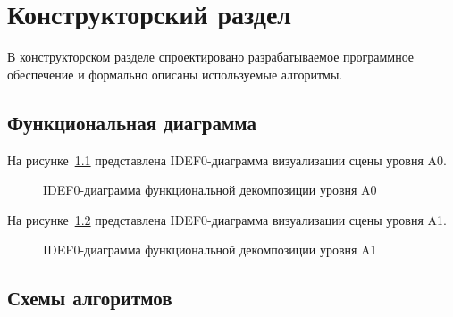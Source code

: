 \chapter{Конструкторский раздел}
В конструкторском разделе спроектировано разрабатываемое программное обеспечение и формально описаны используемые алгоритмы.

\section{Функциональная диаграмма}
На рисунке~\ref{fig:a0} представлена IDEF0-диаграмма визуализации сцены уровня A0.
\begin{figure}[ht!]
	\centering
	   
	\caption{IDEF0-диаграмма функциональной декомпозиции уровня A0}
	\label{fig:a0}
\end{figure}

На рисунке~\ref{fig:a1} представлена IDEF0-диаграмма визуализации сцены уровня A1.
\begin{figure}[ht!]
	\centering
	   
	\caption{IDEF0-диаграмма функциональной декомпозиции уровня A1}
	\label{fig:a1}
\end{figure}
\clearpage

\section{Схемы алгоритмов}


